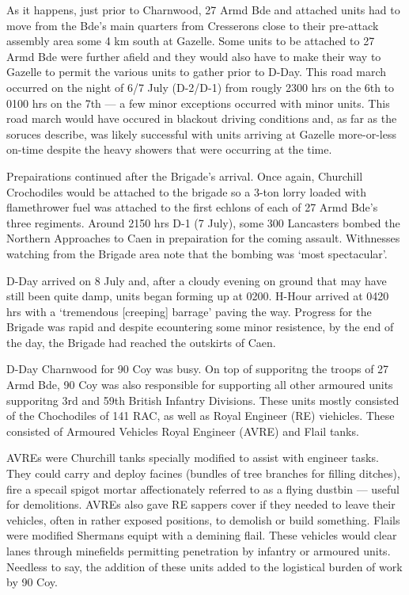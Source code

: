\documentclass[noraggedright]{turabian-researchpaper}
\newcommand{\CharnAdm}{27 Armd Bde Adm Order No. 7, 7 July 1944}
\begin{document}
As it happens, just prior to Charnwood, 27 Armd Bde and attached units
had to move from the Bde's main quarters from Cresserons close to their 
pre-attack assembly area some 4 km south at Gazelle.  Some units to be 
attached to 27 Armd Bde were further afield and they would also have to
make their way to Gazelle to permit the various units to gather prior to 
D-Day.  This road march occurred on the night of 6/7 July (D-2/D-1) from
rougly 2300 hrs on the 6th to 0100 hrs on the 7th --- a few minor exceptions
occurred with minor units.\autocite[Appendix C, 27 Armd Bde Operation Order 
No 2, 6 July 1944]{27wd}  This road march would have occured in
blackout driving conditions and, as far as the soruces describe, was likely
successful with units arriving at Gazelle more-or-less on-time despite the
heavy showers that were occurring at the time.\autocite[6 June 1944]{1raf}

Prepairations continued after the Brigade's arrival.  Once again, Churchill
Crochodiles would be attached to the brigade so a 3-ton lorry loaded with 
flamethrower fuel was attached to the first echlons of each of 27 Armd Bde's
three regiments.\autocite[7 July 1944]{90wd}  Around 2150 hrs D-1 (7 July), 
some 300 Lancasters bombed the Northern Approaches to Caen in prepairation 
for the coming assault. Withnesses watching from the Brigade area note that 
the bombing was `most spectacular'.\autocite[7 July 1944]{27wd} 

D-Day arrived on 8 July and,
after a cloudy evening on ground that may have still been quite damp, 
units began forming up at 0200. 
H-Hour arrived at 0420 hrs with a `tremendous [creeping] barrage' paving the 
way.\autocite[8 July 1944]{27wd}  Progress for the Brigade was rapid and
despite ecountering some minor resistence, by the end of the day, the 
Brigade had reached the outskirts of Caen.\autocite[8 July 1944]{27wd}

D-Day Charnwood for 90 Coy was busy.  On top of supporitng the troops of
27 Armd Bde, 90 Coy was also responsible for supporting all other armoured
units supporitng 3rd and 59th British Infantry Divisions.\autocite
[\CharnAdm][Para. 3]{27wd}  These units mostly consisted of the Chochodiles
of 141 RAC, as well as Royal Engineer (RE) viehicles.  These consisted of 
Armoured Vehicles Royal Engineer (AVRE) and Flail tanks.  

AVREs were 
Churchill tanks specially modified to assist with engineer tasks.  They
could carry and deploy facines (bundles of tree branches for filling
ditches), fire a specail spigot mortar affectionately referred to as a 
flying dustbin --- useful for demolitions.  AVREs also gave RE sappers 
cover if they needed to leave their vehicles, often in rather exposed 
positions, to demolish or build something.  
Flails were modified Shermans equipt with a demining flail.  These
vehicles would clear lanes through minefields permitting penetration by
infantry or armoured units.  Needless to say, the addition of these
units added to the logistical burden of work by 90 Coy. 
\end{document}
